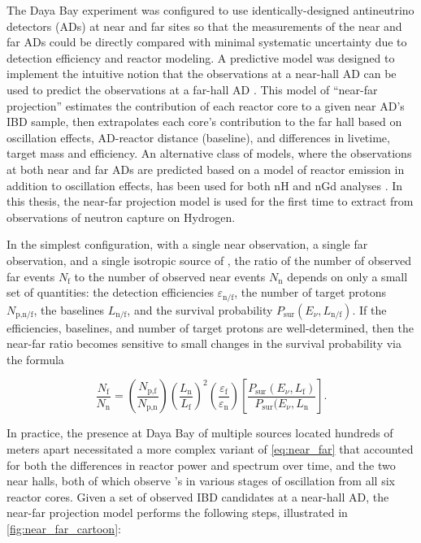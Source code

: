 The Daya Bay experiment was configured to use
identically-designed antineutrino detectors (ADs) at near and far sites
so that the measurements of the near and far ADs could be directly compared
with minimal systematic uncertainty due to detection efficiency
and reactor \nuebar{} modeling.
A predictive model was designed to implement the intuitive notion
that the observations at a near-hall AD can be used to predict
the observations at a far-hall AD \cite{p12e_fitter,p14a_fitter}.
This model of ``near-far projection'' estimates the contribution of each reactor core
to a given near AD's IBD sample,
then extrapolates each core's contribution to the far hall
based on oscillation effects, AD-reactor distance (baseline),
and differences in livetime, target mass and efficiency.
An alternative class of models,
where the observations at both near and far ADs
are predicted based on a model of reactor \nuebar{} emission
in addition to oscillation effects,
has been used for both nH and nGd analyses \cite{nh2016, ngd2016}.
In this thesis, the near-far projection model is used for the first time
to extract \thetaot{} from observations of neutron capture on Hydrogen.


In the simplest configuration, with a single near observation,
a single far observation, and a single isotropic source of \nuebar,
the ratio of the number of observed far events $N_\text{f}$
to the number of observed near events $N_\text{n}$
depends on only a small set of quantities:
the detection efficiencies $\varepsilon_\text{n/f}$,
the number of target protons $N_\text{p,n/f}$,
the baselines $L_\text{n/f}$,
and the survival probability $P_\text{sur}(E_\nu, L_\text{n/f})$.
If the efficiencies, baselines, and number of target protons are well-determined,
then the near-far ratio becomes sensitive
to small changes in the survival probability via the formula \cite{ngd2016}

\begin{equation}\label{eq:near_far}
    \frac{N_\text{f}}{N_\text{n}} = \left(\frac{N_\text{p,f}}{N_\text{p,n}}\right)
    \left(\frac{L_\text{n}}{L_\text{f}}\right)^2
    \left(\frac{\varepsilon_\text{f}}{\varepsilon_\text{n}}\right)
    \left[\frac{P_\text{sur}(E_\nu, L_\text{f})}{P_\text{sur}(E_\nu, L_\text{n}}\right].
\end{equation}

In practice, the presence at Daya Bay of multiple \nuebar{} sources
located hundreds of meters apart
necessitated a more complex variant of \cref{eq:near_far}
that accounted for both the differences in reactor power and \nuebar{} spectrum over time,
and the two near halls, both of which observe \nuebar{}'s
in various stages of oscillation from all six reactor cores.
Given a set of observed IBD candidates at a near-hall AD,
the near-far projection model performs the following steps,
illustrated in \cref{fig:near_far_cartoon}:

